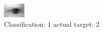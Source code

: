 \begin{figure}[h!]
\begin{center}
\includegraphics[width=0.60\columnwidth]{figures/ID348_class_1_target_2.png}
\end{center}
\caption{ Classification: 1 actual target: 2}
\label{fig:ID348_class_1_target_2}
\end{figure}
